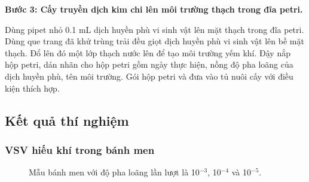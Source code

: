 \textbf{Bước 3: Cấy truyền dịch kim chi lên môi trường thạch trong đĩa petri.}

Dùng pipet nhỏ 0.1 mL dịch huyền phù vi sinh vật lên mặt thạch trong đĩa petri. Dùng que trang đã khử trùng trải đều giọt dịch huyền phù vi sinh vật lên bề mặt thạch. Đổ lên đó một lớp thạch nước lên để tạo môi trường yếm khí. Đậy nắp hộp petri, dán nhãn cho hộp petri gồm ngày thực hiện, nồng độ pha loãng của dịch huyền phù, tên môi trường. Gói hộp petri và đưa vào tủ nuôi cấy với điều kiện thích hợp.

\subsection{Kết quả thí nghiệm}

\subsubsection{VSV hiếu khí trong bánh men}

\begin{figure}[h]
      \centering
      \qquad
      \qquad
  \caption{Mẫu bánh men với độ pha loãng lần lượt là 10$^{-3}$, 10$^{-4}$ và 10$^{-5}$.}
\end{figure}

